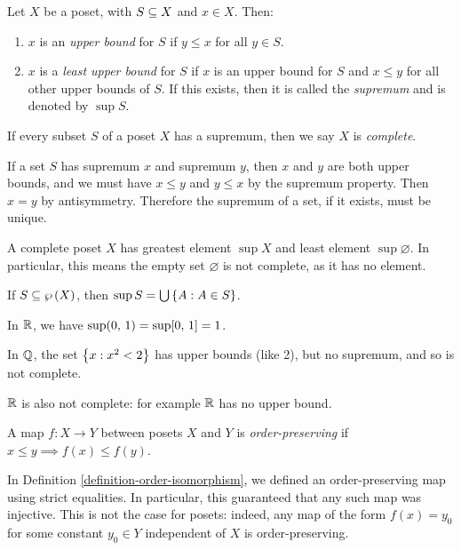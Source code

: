 \documentclass{article}
\begin{document}
\begin{definition}[Supremum]
	\label{supremum-upper-bound-complete}
    Let $X$ be a poset, with $S \subseteq X$ and $x \in X$. Then:
    \begin{enumerate}
    	\item $x$ is an \textit{upper bound} for $S$ if $y \leq x$ for all $y \in S$.
    	\item $x$ is a \textit{least upper bound} for $S$ if $x$ is an upper bound for $S$ and $x \leq y$ for all other upper bounds of $S$. If this exists, then it is called the \textit{supremum} and is denoted by $\sup S$.
	\end{enumerate}
	If every subset $S$ of a poset $X$ has a supremum, then we say $X$ is \textit{complete}.
\end{definition}

\begin{note}
	If a set $S$ has supremum $x$ and supremum $y$, then $x$ and $y$ are both upper bounds, and we must have $x \leq y$ and $y \leq x$ by the supremum property. Then $x = y$ by antisymmetry. Therefore the supremum of a set, if it exists, must be unique.
\end{note}

\begin{corollary}
    A complete poset $X$ has greatest element $\sup X$ and least element $\sup \varnothing$. In particular, this means the empty set $\varnothing$ is not complete, as it has no element.
\end{corollary}

\begin{example}[Supremum]
    If $S \subseteq \wp\left(X\right)$, then $\sup S = \bigcup \left\lbrace A : A \in S \right\rbrace$.
    
    In $\mathbb{R}$, we have $\sup (0, \, 1) = \sup [0, \, 1] = 1$.
    
    In $\mathbb{Q}$, the set $\left\lbrace x : x^2 < 2 \right\rbrace$ has upper bounds (like 2), but no supremum, and so is not complete.
    
    $\mathbb{R}$ is also not complete: for example $\mathbb{R}$ has no upper bound.
\end{example}

\begin{definition}
    A map $f : X \to Y$ between posets $X$ and $Y$ is \textit{order-preserving} if $x \leq y \implies f(x) \leq f(y)$.
\end{definition}

\begin{note}
	In Definition \ref{definition-order-isomorphism}, we defined an order-preserving map using strict equalities. In particular, this guaranteed that any such map was injective. This is not the case for posets: indeed, any map of the form $f(x) = y_0$ for some constant $y_0 \in Y$ independent of $X$ is order-preserving.
\end{note}
\end{document}
